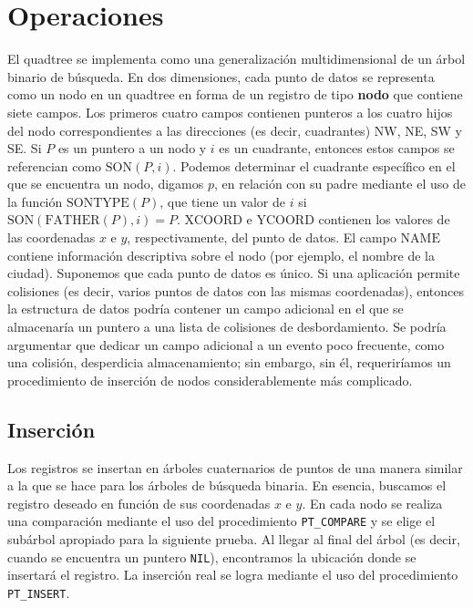 \documentclass[9pt,a4paper,twoside]{rho-class/rho}
\begin{document}
    \section{Operaciones}
        El quadtree se implementa como una generalización multidimensional de un árbol binario de búsqueda. En dos dimensiones, cada punto de datos se representa como un nodo en un quadtree en forma de un registro de tipo \textbf{nodo} que contiene siete campos. Los primeros cuatro campos contienen punteros a los cuatro hijos del nodo correspondientes a las direcciones (es decir, cuadrantes) NW, NE, SW y SE. Si $P$ es un puntero a un nodo y $i$ es un cuadrante, entonces estos campos se referencian como $\text{SON}(P, i)$. Podemos determinar el cuadrante específico en el que se encuentra un nodo, digamos $p$, en relación con su padre mediante el uso de la función $\text{SONTYPE}(P)$, que tiene un valor de $i$ si $\text{SON}(\text{FATHER}(P),i) = P$.
        $\text{XCOORD}$ e $\text{YCOORD}$ contienen los valores de las coordenadas $x$ e $y$, respectivamente, del punto de datos. El campo $\text{NAME}$ contiene información descriptiva sobre el nodo (por ejemplo, el nombre de la ciudad). Suponemos que cada punto de datos es único. Si una aplicación permite colisiones (es decir, varios puntos de datos con las mismas coordenadas), entonces la estructura de datos podría contener un campo adicional en el que se almacenaría un puntero a una lista de colisiones de desbordamiento. Se podría argumentar que dedicar un campo adicional a un evento poco frecuente, como una colisión, desperdicia almacenamiento; sin embargo, sin él, requeriríamos un procedimiento de inserción de nodos considerablemente más complicado.

        \subsection{Inserción}
            Los registros se insertan en árboles cuaternarios de puntos de una manera similar a la que se hace para los árboles de búsqueda binaria. En esencia, buscamos el registro deseado en función de sus coordenadas \(x\) e \(y\). En cada nodo se realiza una comparación mediante el uso del procedimiento \texttt{PT\_COMPARE} y se elige el subárbol apropiado para la siguiente prueba. Al llegar al final del árbol (es decir, cuando se encuentra un puntero \texttt{NIL}), encontramos la ubicación donde se insertará el registro. La inserción real se logra mediante el uso del procedimiento \texttt{PT\_INSERT}.
        
\end{document}
